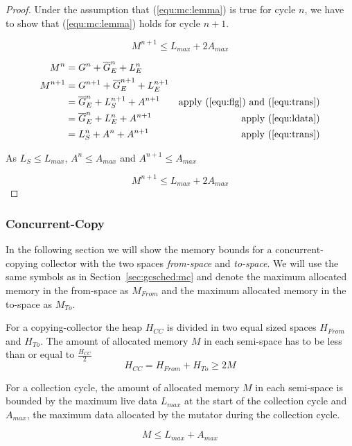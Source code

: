 \begin{proof}
Under the assumption that (\ref{equ:mc:lemma}) is true for cycle
$n$, we have to show that (\ref{equ:mc:lemma}) holds for cycle
$n+1$.

\begin{equation}
    M^{n+1} \le L_{max} + 2 A_{max}
\end{equation}

\begin{align}
    M^n & = G^n + \overline{G}_E^n + L_E^n\\
    M^{n+1} & = G^{n+1} + \overline{G}_E^{n+1} + L_E^{n+1}\\
\nonumber
            & = \overline{G}_E^n + L_S^{n+1} + A^{n+1}
                & \mbox{apply (\ref{equ:flg}) and (\ref{equ:trans})}\\
\nonumber
            & = \overline{G}_E^n + L_E^{n} + A^{n+1}
                & \mbox{apply (\ref{equ:ldata})}\\
            & = L_S^{n} + A^n + A^{n+1}
                & \mbox{apply (\ref{equ:trans})}
\end{align}

As $L_S \le L_{max}$, $A^n \le A_{max}$ and $A^{n+1} \le A_{max}$

\begin{equation}
    M^{n+1} \le L_{max} + 2 A_{max}
\end{equation}


\end{proof}

\subsubsection{Concurrent-Copy}

In the following section we will show the memory bounds for a
concurrent-copying collector with the two spaces \emph{from-space}
and \emph{to-space}. We will use the same symbols as in
Section~\ref{sec:gcsched:mc} and denote the maximum allocated memory
in the from-space as $M_{From}$ and the maximum allocated memory in
the to-space as $M_{To}$.

For a copying-collector the heap $H_{CC}$ is divided in two equal
sized spaces $H_{From}$ and $H_{To}$. The amount of allocated memory
$M$ in each semi-space has to be less than or equal to
$\frac{H_{CC}}{2}$
%
\begin{equation}\label{equ:ccheapmin}
    H_{CC} = H_{From} + H_{To} \ge 2M
\end{equation}
%

\begin{lemma}

For a collection cycle, the amount of allocated memory $M$ in each
semi-space is bounded by the maximum live data $L_{max}$ at the start
of the collection cycle and $A_{max}$, the maximum data allocated by
the mutator during the collection cycle.

\begin{equation}\label{equ:cc:lemma}
    M \le L_{max} + A_{max}
\end{equation}

\end{lemma}

